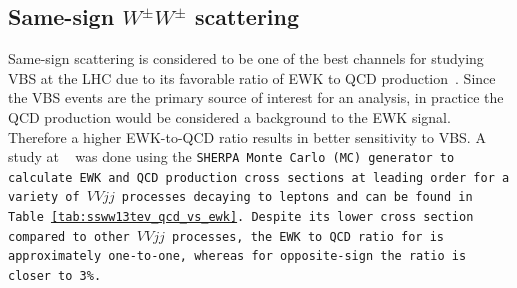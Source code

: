 \subsection{Same-sign $W^{\pm}W^{\pm}$ scattering}\label{ssww13tev:ssww_topology}
Same-sign \ssww scattering is considered to be one of the best channels for studying VBS at the LHC due to its favorable ratio of EWK to QCD production~\cite{2015.higgs-constraints-from-vbs}.
Since the VBS events are the primary source of interest for an analysis, in practice the QCD production would be considered a background to the EWK signal.
Therefore a higher EWK-to-QCD ratio results in better sensitivity to VBS.
A study at ~\cite{2013.ssww-8tev-atlas-support} was done using the \tt{SHERPA} Monte Carlo (MC) generator to calculate EWK and QCD production cross sections at leading order for a variety of $VVjj$ processes decaying to leptons and can be found in Table~\ref{tab:ssww13tev_qcd_vs_ewk}.
Despite its lower cross section compared to other $VVjj$ processes, the EWK to QCD ratio for \ssww is approximately one-to-one, whereas for opposite-sign \oswwjj the ratio is closer to 3\%.


